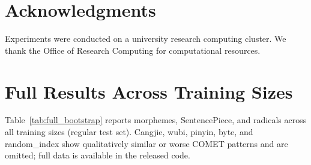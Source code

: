 \documentclass[11pt]{article}
\begin{document}
\section*{Acknowledgments}

Experiments were conducted on a university research computing cluster. We thank the Office of Research Computing for computational resources.



\appendix
\section{Full Results Across Training Sizes}
\label{app:full_results}

Table~\ref{tab:full_bootstrap} reports morphemes, SentencePiece, and radicals across all training sizes (regular test set). Cangjie, wubi, pinyin, byte, and random\_index show qualitatively similar or worse COMET patterns and are omitted; full data is available in the released code.
\end{document}
